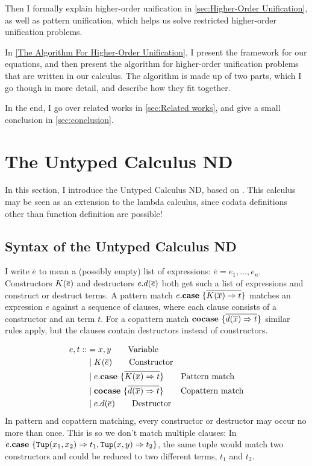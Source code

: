 \documentclass[twoside,12pt,a4paper]{article}
\begin{document}
Then I formally explain higher-order unification in \cref{sec:Higher-Order Unification}, 
as well as pattern unification, which helps us solve restricted higher-order unification problems.

In \cref{The Algorithm For Higher-Order Unification}, I present the framework for our equations, 
and then present the algorithm for higher-order unification problems that are written in our calculus.
The algorithm is made up of two parts, which I go though in more detail, and describe how they fit together.

In the end, I go over related works in \cref{sec:Related works}, and give a small conclusion in \cref{sec:conclusion}.

\section{The Untyped Calculus ND}\label{sec:The Untyped Calculus ND}

In this section, I introduce the Untyped Calculus ND, based on \cite{binder2024programming}.
This calculus may be seen as an extension to the lambda calculus,
since codata definitions other than function definition are possible!

\subsection{Syntax of the Untyped Calculus ND}\label{sec:syntax}

I write $\overline{e}$ to mean a (possibly empty) list of expressions: $\overline{e}= e_1, ..., e_n$.  
Constructors $K(\overline{e})$ and destructors $e.d(\overline{e})$ both get such a list of expressions and construct or destruct terms.
A pattern match $e.\textbf{case}\ \{\overline{K(\overline{x})\Rightarrow t}\}$ matches an expression $e$ against a sequence of clauses, where each clause consists of a constructor and an term $t$.
For a copattern match $\textbf{cocase}\ \{\overline{d(\overline{x})\Rightarrow t}\}$
similar rules apply, but the clauses contain destructors instead of constructors.

\begin{definition}
    \begin{align*}
    e,t ::&=  x,y  \tag*{Variable} \\
        &\;|\;K(\overline{e}) \tag*{Constructor} \\
        &\;|\;e.\textbf{case}\ \{\overline{K(\overline{x})\Rightarrow t}\}  \tag*{Pattern match}\\
        &\;|\;\textbf{cocase}\ \{\overline{d(\overline{x})\Rightarrow t}\}  \tag*{Copattern match}\\
        &\;|\;e.d(\overline{e})  \tag*{Destructor}
    \end{align*}
    In pattern and copattern matching, every constructor or destructor may occur no more than once.
    This is so we don't match multiple clauses:
    In $e.\textbf{case}\ \{\mathtt{Tup(}x_1, x_2\mathtt{)}\Rightarrow t_1, \mathtt{Tup(}x, y\mathtt{)}\Rightarrow t_2\}$, 
    the same tuple would match two constructors and could be reduced to two different terms, $t_1$ and $t_2$.
\end{definition}
\end{document}
